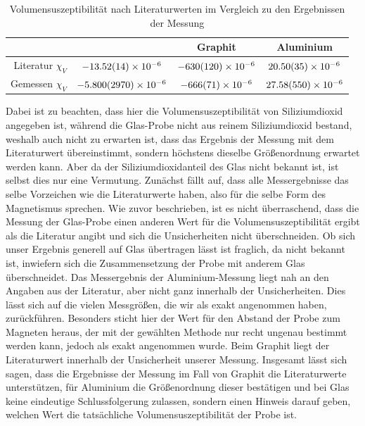 \documentclass[
	a4paper,
	12pt,
	pagesize,
	ngerman
]{scrartcl}
\begin{document}
	\begin{table}[h]
		\centering
	\begin{tabular}{ r | c | c | c}
		& \ce{SiO2} & Graphit & Aluminium \\ \hline
		Literatur $\chi_V $ & $\SI{-13,52 \pm 0,14 e-6}{}$ & $\SI{-630 \pm 120 e-6}{}$ & $\SI{20,50 \pm 0,35 e-6}{}$\\
		Gemessen  $\chi_V $ & $\SI{-5,800 \pm 2.97 e-6}{}$&$\SI{-666 \pm 71 e-6}{}$&$\SI{27,58 \pm 5.5e-6}{}$\\ \hline 
	\end{tabular} 
	\caption{Volumensuszeptibilität nach Literaturwerten im Vergleich zu den Ergebnissen der Messung}
	\end{table}
	Dabei ist zu beachten, dass hier die Volumensuszeptibilität von Siliziumdioxid angegeben ist, während die Glas-Probe nicht aus reinem Siliziumdioxid bestand, weshalb auch nicht zu erwarten ist, dass das Ergebnis der Messung mit dem Literaturwert übereinstimmt, sondern höchstens dieselbe Größenordnung erwartet werden kann. Aber da der Siliziumdioxidanteil des Glas nicht bekannt ist, ist selbst dies nur eine Vermutung.  \newline
	Zunächst fällt auf, dass alle Messergebnisse das selbe Vorzeichen wie die Literaturwerte haben, also für die selbe Form des Magnetismus sprechen.\newline 
	Wie zuvor beschrieben, ist es nicht überraschend, dass die Messung der Glas-Probe einen anderen Wert für die Volumensuszeptibilität ergibt als die Literatur angibt und sich die Unsicherheiten nicht überschneiden. Ob sich unser Ergebnis generell auf Glas übertragen lässt ist fraglich, da nicht bekannt ist, inwiefern sich die Zusammensetzung der Probe mit anderem Glas überschneidet. Das Messergebnis der Aluminium-Messung liegt nah an den Angaben aus der Literatur, aber nicht ganz innerhalb der Unsicherheiten. Dies lässt sich auf die vielen Messgrößen, die wir als exakt angenommen haben, zurückführen. Besonders sticht hier der Wert für den Abstand der Probe zum Magneten heraus, der mit der gewählten Methode nur recht ungenau bestimmt werden kann, jedoch als exakt angenommen wurde. %
	Beim Graphit liegt der Literaturwert innerhalb der Unsicherheit unserer Messung. \newline
	Insgesamt lässt sich sagen, dass die Ergebnisse der Messung im Fall von Graphit die Literaturwerte unterstützen, für Aluminium die Größenordnung dieser bestätigen und bei Glas keine eindeutige Schlussfolgerung zulassen, sondern einen Hinweis darauf geben, welchen Wert die tatsächliche Volumensuszeptibilität der Probe ist.
	
\end{document}
